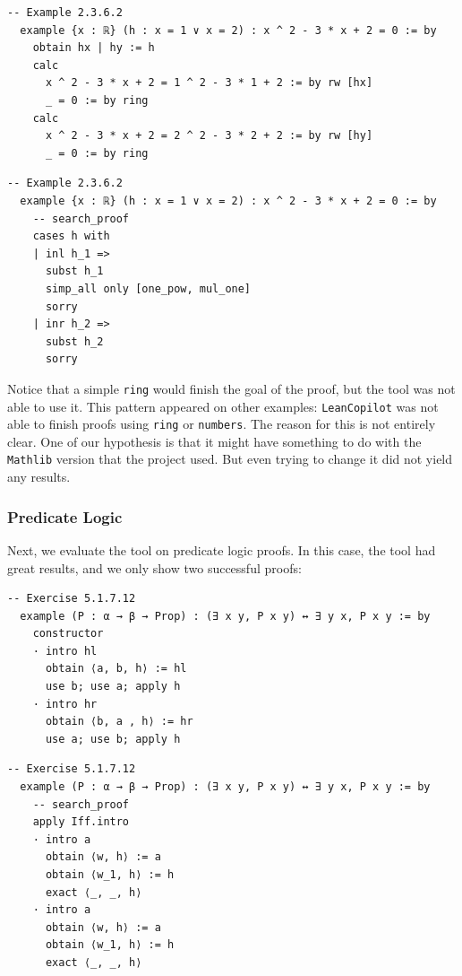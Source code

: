 \documentclass[12pt]{article}
\newcommand{\leancopilot}{\texttt{LeanCopilot} }
\begin{document}
\begin{minipage}{0.495\textwidth}
  \begin{lstlisting}[title={Human proof}]
  -- Example 2.3.6.2
  example {x : ℝ} (h : x = 1 ∨ x = 2) : x ^ 2 - 3 * x + 2 = 0 := by
    obtain hx | hy := h
    calc
      x ^ 2 - 3 * x + 2 = 1 ^ 2 - 3 * 1 + 2 := by rw [hx]
      _ = 0 := by ring
    calc
      x ^ 2 - 3 * x + 2 = 2 ^ 2 - 3 * 2 + 2 := by rw [hy]
      _ = 0 := by ring
  \end{lstlisting}
\end{minipage}
\vline
\begin{minipage}{0.495\textwidth}
  \begin{lstlisting}[title={\leancopilot proof}]
  -- Example 2.3.6.2
  example {x : ℝ} (h : x = 1 ∨ x = 2) : x ^ 2 - 3 * x + 2 = 0 := by
    -- search_proof
    cases h with
    | inl h_1 =>
      subst h_1
      simp_all only [one_pow, mul_one]
      sorry
    | inr h_2 =>
      subst h_2
      sorry
  \end{lstlisting}
\end{minipage}

Notice that a simple \texttt{ring} would finish the goal of the proof, but the tool was not able to use it. This pattern appeared on other examples: \texttt{LeanCopilot} was not able to finish proofs using \texttt{ring} or \texttt{numbers}. The reason for this is not entirely clear. One of our hypothesis is that it might have something to do with the \texttt{Mathlib} version that the project used. But even trying to change it did not yield any results.

\subsubsection{Predicate Logic}
Next, we evaluate the tool on predicate logic proofs. In this case, the tool had great results, and we only show two successful proofs:


\begin{minipage}{0.495\textwidth}
  \begin{lstlisting}[title={Human proof}]
   -- Exercise 5.1.7.12
  example (P : α → β → Prop) : (∃ x y, P x y) ↔ ∃ y x, P x y := by
    constructor
    · intro hl
      obtain ⟨a, b, h⟩ := hl
      use b; use a; apply h
    · intro hr
      obtain ⟨b, a , h⟩ := hr
      use a; use b; apply h
  \end{lstlisting}
\end{minipage}
\vline
\begin{minipage}{0.495\textwidth}
  \begin{lstlisting}[title={\leancopilot proof}]
  -- Exercise 5.1.7.12
  example (P : α → β → Prop) : (∃ x y, P x y) ↔ ∃ y x, P x y := by
    -- search_proof
    apply Iff.intro
    · intro a
      obtain ⟨w, h⟩ := a
      obtain ⟨w_1, h⟩ := h
      exact ⟨_, _, h⟩
    · intro a
      obtain ⟨w, h⟩ := a
      obtain ⟨w_1, h⟩ := h
      exact ⟨_, _, h⟩
  \end{lstlisting}
\end{minipage}
\end{document}
